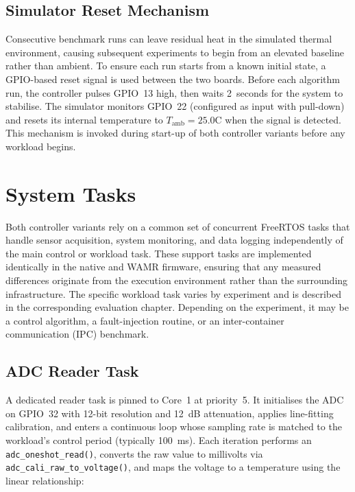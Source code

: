 \documentclass[12pt, a4paper]{report}
\begin{document}
\subsection{Simulator Reset Mechanism}
\label{subsec:sim-reset}

Consecutive benchmark runs can leave residual heat in the simulated thermal environment, causing subsequent experiments to begin from an elevated baseline rather than ambient. To ensure each run starts from a known initial state, a GPIO-based reset signal is used between the two boards. Before each algorithm run, the controller pulses GPIO~13 high, then waits 2~seconds for the system to stabilise. The simulator monitors GPIO~22 (configured as input with pull-down) and resets its internal temperature to $T_{\text{amb}} = 25.0$\textdegree C when the signal is detected. This mechanism is invoked during start-up of both controller variants before any workload begins.

\section{System Tasks}
\label{sec:tasks}

Both controller variants rely on a common set of concurrent FreeRTOS tasks that handle sensor acquisition, system monitoring, and data logging independently of the main control or workload task. These support tasks are implemented identically in the native and WAMR firmware, ensuring that any measured differences originate from the execution environment rather than the surrounding infrastructure. The specific workload task varies by experiment and is described in the corresponding evaluation chapter. Depending on the experiment, it may be a control algorithm, a fault-injection routine, or an inter-container communication (IPC) benchmark.

\subsection{ADC Reader Task}
\label{subsec:native-reader}

A dedicated reader task is pinned to Core~1 at priority~5. It initialises the ADC on GPIO~32 with 12-bit resolution and 12~dB attenuation, applies line-fitting calibration, and enters a continuous loop whose sampling rate is matched to the workload's control period (typically 100~ms). Each iteration performs an \texttt{adc\_oneshot\_read()}, converts the raw value to millivolts via \texttt{adc\_cali\_raw\_to\_voltage()}, and maps the voltage to a temperature using the linear relationship:
\end{document}
